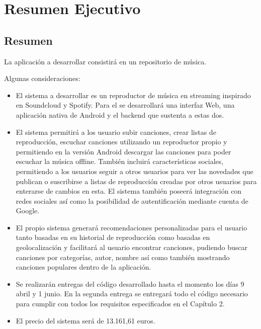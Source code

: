 
\chapter{Resumen Ejecutivo} %

\label{Chapter1} %


\section{Resumen}

La aplicación a desarrollar consistirá en un repositorio de música. 

Algunas consideraciones:
\begin{itemize}
	\item El sistema a desarrollar es un reproductor de música en streaming inspirado en Soundcloud y Spotify. Para el se desarrollará una interfaz Web, una aplicación nativa de Android y el backend que sustenta a estas dos.
	\item El sistema permitirá a los usuario subir canciones, crear listas de reproducción, escuchar canciones utilizando un reproductor propio y permitiendo en la versión Android descargar las canciones para poder escuchar la música offline. También incluirá características sociales, permitiendo a los usuarios seguir a otros usuarios para ver las novedades que publican o suscribirse a listas de reproducción creadas por otros usuarios para enterarse de cambios en esta. El sistema también poseerá integración con redes sociales así como la posibilidad de autentificaci\'on mediante cuenta de Google.
	\item El propio sistema generará recomendaciones personalizadas para el usuario tanto basadas en su historial de reproducción como basadas en geolocalización y facilitará al usuario encontrar canciones, pudiendo buscar canciones por categorías, autor, nombre así como también mostrando canciones populares dentro de la aplicación.
	
	\item Se realizar\'an entregas del c\'odigo desarrollado hasta el momento los d\'ias 9 abril y 1 junio. En la segunda entrega se entregar\'a todo el c\'odigo necesario para cumplir con todos los requisitos especificados en el Cap\'itulo 2.
	\item El precio del sistema ser\'a de 13.161,61 euros.
\end{itemize}
